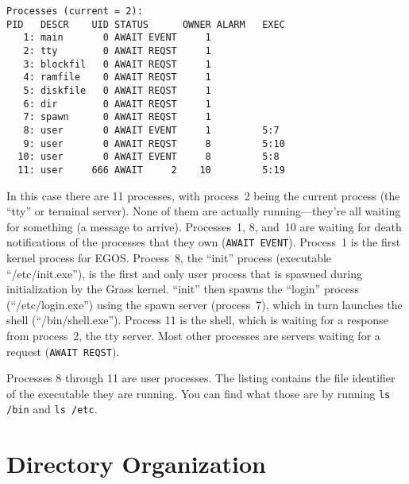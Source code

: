 \documentclass{article}
\begin{document}
\begin{verbatim}
Processes (current = 2):
PID   DESCR    UID STATUS      OWNER ALARM   EXEC
   1: main       0 AWAIT EVENT     1
   2: tty        0 AWAIT REQST     1
   3: blockfil   0 AWAIT REQST     1
   4: ramfile    0 AWAIT REQST     1
   5: diskfile   0 AWAIT REQST     1
   6: dir        0 AWAIT REQST     1
   7: spawn      0 AWAIT REQST     1
   8: user       0 AWAIT EVENT     1         5:7
   9: user       0 AWAIT REQST     8         5:10
  10: user       0 AWAIT EVENT     8         5:8
  11: user     666 AWAIT     2    10         5:19
\end{verbatim}

In this case there are 11 processes, with process~2 being the
current process (the ``tty'' or terminal server).  None of them are actually
running---they're all waiting for something (a message to arrive).
Processes~1, 8, and~10 are waiting for death notifications of the processes
that they own (\texttt{AWAIT EVENT}).
Process~1 is the first kernel process for EGOS.
Process~8, the ``init'' process (executable ``/etc/init.exe''),
is the first and only user process that is spawned during initialization
by the Grass kernel.  ``init'' then spawns the ``login'' process
(``/etc/login.exe'') using the spawn server (process~7), which in turn
launches the shell (``/bin/shell.exe'').
Process 11 is the shell, which is waiting for a response from process~2,
the tty server.
Most other processes are servers waiting for a request (\texttt{AWAIT REQST}).

Processes 8 through 11 are user processes.  The listing contains the
file identifier of the executable they are running.  You can find what
those are by running \texttt{ls /bin} and \texttt{ls /etc}.

\section{Directory Organization}
\end{document}
